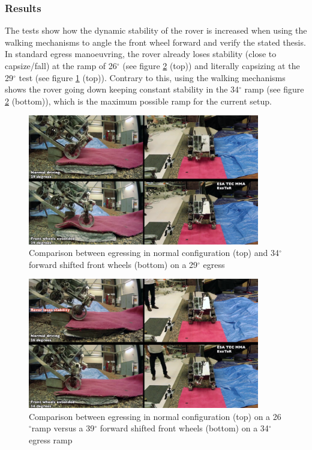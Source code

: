 \documentclass[a4paper,twocolumn]{esapub2005} %
\begin{document}
\subsubsection{Results}

The tests show how the dynamic stability of the rover is increased when using
the walking mechanisms to angle the front wheel forward and verify the stated
thesis.  In standard egress manoeuvring, the rover already loses stability
(close to capsize/fall) at the ramp of 26$^\circ$ (see figure
\ref{fig:egress34} (top)) and literally capsizing at the 29$^\circ$ test (see
figure \ref{fig:egress29} (top)). Contrary to this, using the walking mechanisms
shows the rover going down keeping constant stability in the 34$^\circ$ ramp
(see figure \ref{fig:egress34} (bottom)), which is the maximum possible ramp
for the current setup.

\begin{figure}[h!] \centering
    \includegraphics[width=0.9\textwidth]{egress29.png}	\caption{Comparison
    between egressing in normal configuration (top) and 34$^{\circ}$ forward
    shifted front wheels (bottom) on a 29$^{\circ}$ egress} \label{fig:egress29}
\end{figure}

\begin{figure}[h!] \centering
    \includegraphics[width=0.9\textwidth]{egress34.png}	\caption{Comparison
    between egressing in normal configuration (top)  on a 26$^{\circ}$ramp
    versus a 39$^{\circ}$ forward shifted front wheels (bottom) on a 34$^{\circ}$
    egress ramp}
    \label{fig:egress34}
\end{figure}
\end{document}
